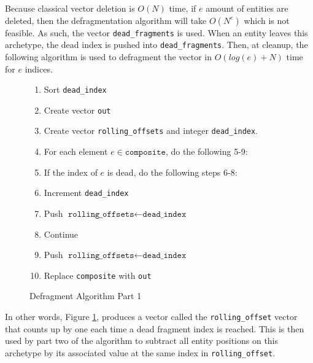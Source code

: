 Because classical vector deletion is $O(N)$ time, if $e$ amount of entities are deleted, then the defragmentation algorithm will take $O(N^e)$ which is not feasible. As such, the vector \texttt{dead\_fragments} is used. When an entity leaves this archetype, the dead index is pushed into \texttt{dead\_fragments}. Then, at cleanup, the following algorithm is used to defragment the vector in $O(log(e) + N)$ time for $e$ indices.

\begin{figure}[H]
    \begin{enumerate}
        \item Sort \texttt{dead\_index}
        \item Create vector \texttt{out}
        \item Create vector \texttt{rolling\_offsets} and integer \texttt{dead\_index}.
        \item For each element $ e \in \texttt{composite}$, do the following 5-9:
        \item If the index of $e$ is dead, do the following steps 6-8:
        \item Increment \texttt{dead\_index}
        \item Push $\texttt{rolling\_offsets} \leftarrow \texttt{dead\_index}$
        \item Continue
        \item Push $\texttt{rolling\_offsets} \leftarrow \texttt{dead\_index}$
        \item Replace \texttt{composite} with \texttt{out}
    \end{enumerate}
    \caption{Defragment Algorithm Part 1}
    \label{alg:defrag1}
\end{figure}

In other words, Figure \ref{alg:defrag1}, produces a vector called the \texttt{rolling\_offset} vector that counts up by one each time a dead fragment index is reached. This is then used by part two of the algorithm to subtract all entity positions on this archetype by its associated value at the same index in \texttt{rolling\_offset}.
                  

